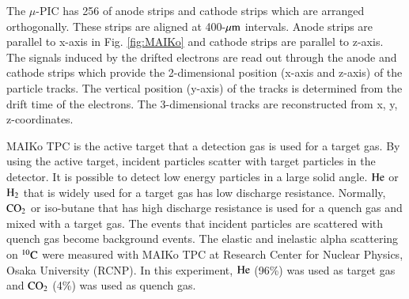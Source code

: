 \documentclass{jps-cp}
\begin{document}
The $\mu$-PIC has 256 of anode strips and cathode strips
which are arranged orthogonally.
These strips are aligned at 400-$\rm{\mu m}$ intervals.
Anode strips are parallel to x-axis in Fig. \ref{fig:MAIKo} and %
cathode strips are parallel to z-axis.%
The signals induced by the drifted electrons are read out through the anode and 
cathode strips which provide the 2-dimensional position (x-axis and z-axis) 
of the particle tracks.
The vertical position (y-axis) of the tracks is determined 
from the drift time of the electrons.
The 3-dimensional tracks are reconstructed from x, y, z-coordinates.

MAIKo TPC is the active target that a detection gas is used for a target gas.
By using the active target, incident particles scatter with target particles in the detector.
It is possible to detect low energy particles in a large solid angle.
$\rm{He}$ or $\rm{H}_{2}$ that is widely used for a target gas
has low discharge resistance.
Normally, $\rm{CO}_{2}$ or iso-butane that has high discharge resistance is used for a quench gas and
mixed with a target gas.
The events that incident particles are scattered with quench gas become background events.
The elastic and inelastic alpha scattering on ${}^{10}\rm{C}$ were measured with MAIKo TPC
at Research Center for Nuclear Physics, Osaka University (RCNP).
In this experiment, $\rm{He}$ (96\%) was used as target gas and $\rm{CO}_{2}$ (4\%) was used as quench gas.
\end{document}
